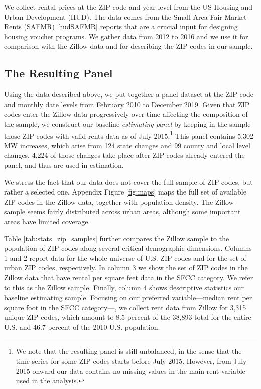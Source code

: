 We collect rental prices at the ZIP code and year level from the US Housing and Urban 
Development (HUD). The data comes from the Small Area Fair Market Rents (SAFMR) \ref{hudSAFMR} 
reports that are a crucial input for designing housing voucher programs. We gather data 
from 2012 to 2016 and we use it for comparison with the Zillow data and for describing 
the ZIP codes in our sample. 


\subsection{The Resulting Panel}\label{sec:data_final_panel}

Using the data described above, we put together a panel dataset at the ZIP code and monthly 
date levels from February 2010 to December 2019. Given that ZIP codes enter the Zillow data 
progressively over time affecting the composition of the sample, we construct our baseline 
\textit{estimating panel} by keeping in the sample those ZIP codes with valid rents data as 
of July 2015.\footnote{We note that the resulting panel is still unbalanced, in the sense 
	that the time series for some ZIP codes starts before July 2015. However, from July
	2015 onward our data contains no missing values in the main rent variable used in the 
	analysis.} 
This panel contains 5,302 MW increases, which arise from 124 state changes and 99 county 
and local level changes. 4,224 of those changes take place after ZIP codes already entered
the panel, and thus are used in estimation.

We stress the fact that our data does not cover the full sample of ZIP codes, but rather 
a selected one. Appendix Figure \ref{fig:maps} maps the full set of available ZIP codes in 
the Zillow data, together with population density. The Zillow sample seems fairly 
distributed across urban areas, although some important areas have limited coverage. 


Table \ref{tab:stats_zip_samples} further compares the Zillow sample to the 
population of ZIP codes along several critical demographic dimensions. Columns 1 
and 2 report data for the whole universe of U.S. ZIP codes and for the set of urban ZIP 
codes, respectively. In column 3 we show the set of ZIP codes in the Zillow data that have 
rental per square feet data in the SFCC category. We refer to this as the Zillow sample. 
Finally, column 4 shows descriptive statistics our baseline estimating sample. Focusing on 
our preferred variable---median rent per square foot in the SFCC category---, we collect rent 
data from Zillow for 3,315 unique ZIP codes, which amount to 8.5 percent of the 38,893 total 
for the entire U.S. and 46.7 percent of the 2010 U.S. population. 


